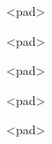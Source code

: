 \documentclass[varwidth]{standalone}
\begin{document}
\begin{CJK*}{UTF8}{gbsn}
{{{\colorbox{red!0.0}{\strut <pad>} \colorbox{red!0.0}{\strut <pad>} \colorbox{red!0.0}{\strut <pad>} \colorbox{red!0.0}{\strut <pad>} \colorbox{red!0.0}{\strut <pad>} 
}}}
\end{CJK*}
\end{document}

